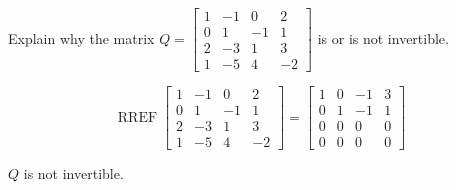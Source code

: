 
\begin{exerciseStatement}


Explain why the matrix \(Q= \left[\begin{array}{cccc}
1 & -1 & 0 & 2 \\
0 & 1 & -1 & 1 \\
2 & -3 & 1 & 3 \\
1 & -5 & 4 & -2
\end{array}\right] \) is or is not invertible.


\end{exerciseStatement}
    
\begin{exerciseAnswer} 


\[\operatorname{RREF} \left[\begin{array}{cccc}
1 & -1 & 0 & 2 \\
0 & 1 & -1 & 1 \\
2 & -3 & 1 & 3 \\
1 & -5 & 4 & -2
\end{array}\right] = \left[\begin{array}{cccc}
1 & 0 & -1 & 3 \\
0 & 1 & -1 & 1 \\
0 & 0 & 0 & 0 \\
0 & 0 & 0 & 0
\end{array}\right] \]

\(Q\) is not invertible.
\end{exerciseAnswer}
    
